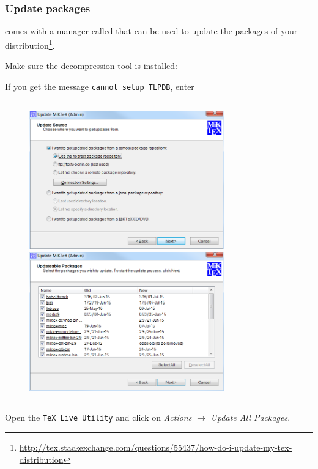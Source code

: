\documentclass{AMdocumentation}
\begin{document}
\subsubsection{Update packages}

\texlive comes with a manager called  that can be used to update the packages of your distribution\footnote{\url{ http://tex.stackexchange.com/questions/55437/how-do-i-update-my-tex-distribution}}. 

\begin{hint}
Make sure the decompression tool  is installed: 
\end{hint}

\begin{hint}
If you get the message \verb|cannot setup TLPDB|, enter
\end{hint}

\subsection{\miktex}


\begin{figure}[h!]
\centering
\includegraphics[width=0.75\textwidth]{Update-MiKTeX-1}
\vskip3mm

\includegraphics[width=0.75\textwidth]{Update-MiKTeX-2}
\end{figure}

\subsection{\mactex}

Open the \verb!TeX Live Utility! and click on \emph{Actions} $\to$ \emph{Update All Packages}.
\end{document}
